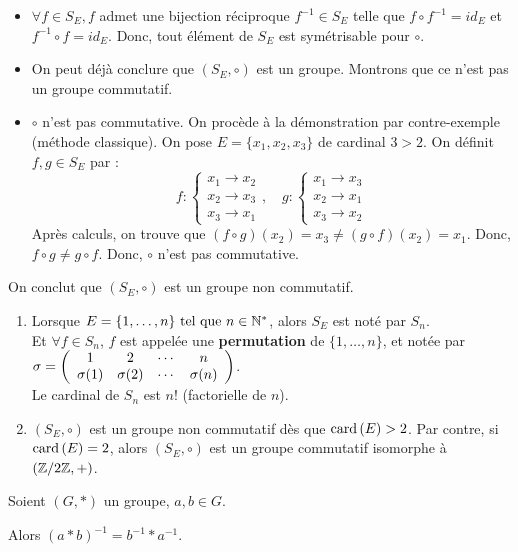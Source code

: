 \documentclass[12pt, a4paper]{report}
\begin{document}
\begin{example}
\begin{itemize}
        \item $\forall f \in S_E, f$ admet une bijection réciproque $f^{-1}\in S_E$ telle que $f\circ f^{-1} = id_E$ et $f^{-1}\circ f = id_E$. Donc, tout élément de $S_E$ est symétrisable pour $\circ$.
        \item On peut déjà conclure que $(S_E,\circ)$ est un groupe. Montrons que ce n'est pas un groupe commutatif.
        \item $\circ$ n'est pas commutative. On procède à la démonstration par contre-exemple (méthode classique). On pose $E=\{x_1,x_2,x_3\}$ de cardinal $3>2$. On définit $f,g\in S_E$ par :
        $$f:\begin{cases}x_1\to x_2\\x_2\to x_3\\x_3\to x_1\end{cases},\quad g:\begin{cases}x_1\to x_3\\x_2\to x_1\\x_3\to x_2\end{cases}$$    
        Après calculs, on trouve que $(f\circ g)(x_2)=x_3\ne (g\circ f)(x_2)=x_1$. Donc, $f\circ g \ne g\circ f$. Donc, $\circ$ n'est pas commutative.
    \end{itemize}
    On conclut que $(S_E,\circ)$ est un groupe non commutatif.
\end{example}

\begin{remark}
    \begin{enumerate}
        \item Lorsque $E = \{1,\dots,n\}\text{ tel que } n\in\mathbb{N}^*$, alors $S_E$ est noté par $S_n$.\\Et $\forall f \in S_n$, $f$ est appelée une \textbf{permutation} de $\{1,\dots,n\}$, et notée par $\sigma=\left(\begin{array}{cccc}1 & 2 & \cdots & n \\ \sigma(1) & \sigma(2) & \cdots & \sigma(n)\end{array}\right)$.\\Le cardinal de $S_n$ est $n!$ (factorielle de $n$).
        \item $(S_E,\circ)$ est un groupe non commutatif dès que $\mathrm{card}\left(E\right)>2$. Par contre, si $\mathrm{card}\left(E\right)=2$, alors $(S_E,\circ)$ est un groupe commutatif isomorphe à $(\mathbb{Z}/2\mathbb{Z},+)$.
    \end{enumerate}
\end{remark}

\begin{property}
    Soient $(G,*)$ un groupe, $a,b\in G$.

    Alors $(a*b)^{-1}=b^{-1} * a^{-1}$.
\end{property}
\end{document}
